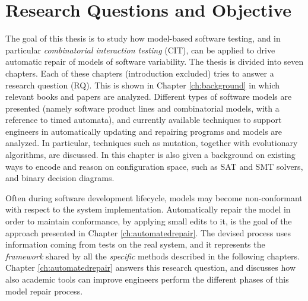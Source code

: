 \section{Research Questions and Objective}\label{sec:rq}
The goal of this thesis is to study how model-based software testing, and in particular \textit{combinatorial interaction testing} (CIT), can be applied to drive automatic repair of models of software variability.
The thesis is divided into seven chapters. Each of these chapters (introduction excluded) tries to answer a research question (RQ).
This is shown in Chapter \ref{ch:background} in which relevant books and papers are analyzed. %
Different types of software models are presented (namely software product lines and combinatorial models, with a reference to timed automata), and currently available techniques to support engineers in automatically updating and repairing programs and models are analyzed. In particular, techniques such as mutation, together with evolutionary algorithms, are discussed. In this chapter is also given a background on existing ways to encode and reason on configuration space, such as SAT and SMT solvers, and binary decision diagrams.

Often during software development lifecycle, models may become non-conformant with respect to the system implementation.
Automatically repair the model in order to maintain conformance, by applying small edits to it, is the goal of the approach presented in Chapter \ref{ch:automatedrepair}. The devised process uses information coming from tests on the real system, and it represents the \textit{framework} shared by all the \textit{specific} methods described in the following chapters. %
Chapter \ref{ch:automatedrepair} answers this research question, and discusses how also academic tools can improve engineers perform the different phases of this model repair process.%

